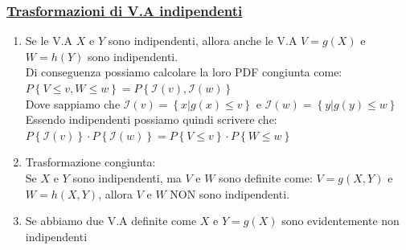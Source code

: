 \documentclass{article}
\begin{document}
\subsubsection{\underline{Trasformazioni di V.A indipendenti}}
\begin{enumerate}
    \item Se le V.A $X$ e $Y$ sono indipendenti, allora anche le V.A $V = g(X)$ e $W = h(Y)$ sono indipendenti. \\
    Di conseguenza possiamo calcolare la loro PDF congiunta come: \\
    $P\left\{ V \leq v, W \leq w \right\} = P\left\{ \mathcal{I}(v), \mathcal{I}(w) \right\}$ \\
    Dove sappiamo che $\mathcal{I}(v) = \left\{ x | g(x) \leq v \right\}$ e $\mathcal{I}(w) = \left\{ y | g(y) \leq w \right\}$ \\
    Essendo indipendenti possiamo quindi scrivere che: \\
    $P\left\{ \mathcal{I}(v) \right\} \cdot P\left\{ \mathcal{I}(w) \right\} = P\left\{ V \leq v\right\} \cdot P\left\{ W \leq w \right\}$
    \item Trasformazione congiunta: \\
    Se $X$ e $Y$ sono indipendenti, ma $V$ e $W$ sono definite come: $V = g(X,Y)$ e $W=h(X,Y)$, allora $V$ e $W$ NON sono indipendenti.
    \item Se abbiamo due V.A definite come $X$ e $Y=g(X)$ sono evidentemente non indipendenti

\end{enumerate}
\end{document}
